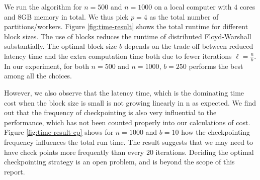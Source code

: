 \documentclass{article} %
\begin{document}
We run the algorithm for $n = 500$ and $n = 1000$ 
on a local computer with $4$ cores and $8$GB memory in 
total. We thus pick $p = 4$ as the total number of partitions/workers. Figure \ref{fig:time-result} shows the total
runtime for different block sizes. The use of blocks reduces the runtime of distributed Floyd-Warshall substantially. The optimal block size $b$ depends on the trade-off between reduced latency time and the extra computation time both due to fewer iterations $\ell = \frac{n}{b}$. In our experiment, for both $n = 500$
and $n = 1000$, $b = 250$ performs the best among all the
choices.

However, we also observe that the latency time,
which is the dominating time cost when the block size is small is not growing linearly in
n as expected. We find out that the frequency of 
checkpointing is also very influential to the performance, which has not been counted properly into our calculations of cost. Figure \ref{fig:time-result-cp} shows for $n = 1000$ and $b = 10$ how the checkpointing frequency influences the total run time. The result suggests that we may need to have check points more frequently than every $20$ iterations. Deciding the optimal checkpointing strategy is an open problem, and is beyond the scope of this report.
\end{document}
